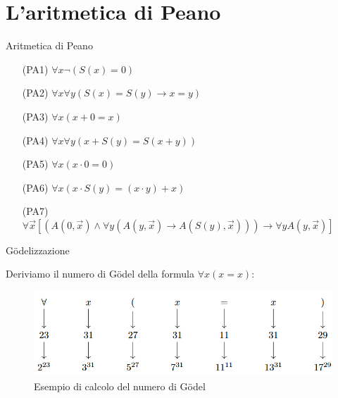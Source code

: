 \documentclass{beamer}
\begin{document}
\section{L'aritmetica di Peano}
\begin{frame}{Aritmetica di Peano}

    \begin{itemize}
        \item[(PA1)] $\forall x \neg (S(x)=0)$
        \item[(PA2)] $\forall x \forall y (S(x)=S(y)\rightarrow x=y)$
        \item[(PA3)] $\forall x (x+0=x)$
        \item[(PA4)] $\forall x \forall y (x+S(y)=S(x+y))$
        \item[(PA5)] $\forall x (x\cdot 0=0)$
        \item[(PA6)] $\forall x (x\cdot S(y)=(x\cdot y)+x)$
        \item[(PA7)] $\forall \vec{x} [(A(0,\vec{x})\land \forall y (A(y,\vec{x})\rightarrow A(S(y),\vec{x})))\rightarrow\forall y A(y,\vec{x})]$
    \end{itemize}

\end{frame}





\begin{frame}{Gödelizzazione}

Deriviamo il numero di G\"odel della formula $\forall x (x=x)$:
\begin{figure}
    \centering
    \includegraphics[scale=0.7]{progetto-2024-05-06-soluzione-dalpra/godel.png}
    \caption{Esempio di calcolo del numero di G\"odel}
    \label{fig:enter-label}
\end{figure}



\end{frame}
\end{document}
